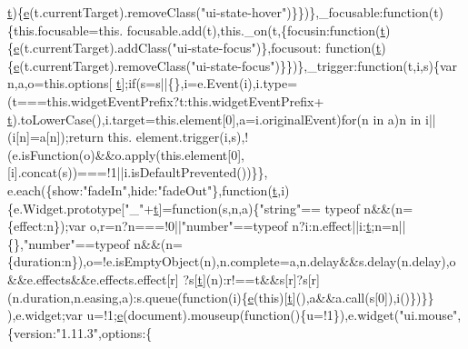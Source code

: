\begin{DoxyCode}
      \hyperlink{jquery-2_80_83_8min_8js_aaccc9105df5383111407fd5b41255e23}{t})\{\hyperlink{jquery-ui_8min_8js_a2c038346d47955cbe2cb91e338edd7e1}{e}(t.currentTarget).removeClass(\textcolor{stringliteral}{"ui-state-hover"})\}\})\},\_focusable:\textcolor{keyword}{function}(t)\{this.focusable=this.
      focusable.add(t),this.\_on(t,\{focusin:\textcolor{keyword}{function}(\hyperlink{jquery-2_80_83_8min_8js_aaccc9105df5383111407fd5b41255e23}{t})\{\hyperlink{jquery-ui_8min_8js_a2c038346d47955cbe2cb91e338edd7e1}{e}(t.currentTarget).addClass(\textcolor{stringliteral}{"ui-state-focus"})\},focusout:\textcolor{keyword}{
      function}(\hyperlink{jquery-2_80_83_8min_8js_aaccc9105df5383111407fd5b41255e23}{t})\{\hyperlink{jquery-ui_8min_8js_a2c038346d47955cbe2cb91e338edd7e1}{e}(t.currentTarget).removeClass(\textcolor{stringliteral}{"ui-state-focus"})\}\})\},\_trigger:\textcolor{keyword}{function}(t,i,s)\{var n,a,o=this.options[
      \hyperlink{jquery-2_80_83_8min_8js_aaccc9105df5383111407fd5b41255e23}{t}];\textcolor{keywordflow}{if}(s=s||\{\},i=e.Event(i),i.type=(t===this.widgetEventPrefix?t:this.widgetEventPrefix+
      \hyperlink{jquery-2_80_83_8min_8js_aaccc9105df5383111407fd5b41255e23}{t}).toLowerCase(),i.target=this.element[0],a=i.originalEvent)\textcolor{keywordflow}{for}(n in a)n in i||(i[n]=a[n]);\textcolor{keywordflow}{return} this.
      element.trigger(i,s),!(e.isFunction(o)&&o.apply(this.element[0],[i].concat(s))===!1||i.isDefaultPrevented())\}\},
      e.each(\{show:\textcolor{stringliteral}{"fadeIn"},hide:\textcolor{stringliteral}{"fadeOut"}\},\textcolor{keyword}{function}(\hyperlink{jquery-2_80_83_8min_8js_aaccc9105df5383111407fd5b41255e23}{t},i)\{e.Widget.prototype[\textcolor{stringliteral}{"\_"}+\hyperlink{jquery-2_80_83_8min_8js_aaccc9105df5383111407fd5b41255e23}{t}]=\textcolor{keyword}{function}(s,n,a)\{\textcolor{stringliteral}{"string"}==
      typeof n&&(n=\{effect:n\});var o,r=n?n===!0||\textcolor{stringliteral}{"number"}==typeof n?i:n.effect||i:\hyperlink{jquery-2_80_83_8min_8js_aaccc9105df5383111407fd5b41255e23}{t};n=n||\{\},\textcolor{stringliteral}{"number"}==typeof n&&(n=
      \{duration:n\}),o=!e.isEmptyObject(n),n.complete=a,n.delay&&s.delay(n.delay),o&&e.effects&&e.effects.effect[r]
      ?s[\hyperlink{jquery-2_80_83_8min_8js_aaccc9105df5383111407fd5b41255e23}{t}](n):r!==t&&s[r]?s[r](n.duration,n.easing,a):s.queue(function(i)\{\hyperlink{jquery-ui_8min_8js_a2c038346d47955cbe2cb91e338edd7e1}{e}(\textcolor{keyword}{this})[\hyperlink{jquery-2_80_83_8min_8js_aaccc9105df5383111407fd5b41255e23}{t}](),a&&a.call(s[0]),i()\})\}\}
      ),e.widget;var u=!1;\hyperlink{jquery-ui_8min_8js_a2c038346d47955cbe2cb91e338edd7e1}{e}(document).mouseup(\textcolor{keyword}{function}()\{u=!1\}),e.widget(\textcolor{stringliteral}{"ui.mouse"},\{version:\textcolor{stringliteral}{"1.11.3"},options:\{

\end{DoxyCode}
